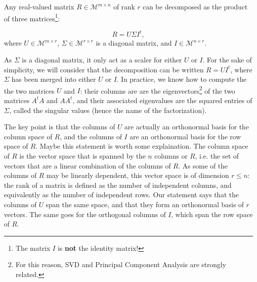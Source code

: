 \begin{proposition}
  Any real-valued matrix $R \in \mathcal{M}^{m \times n}$ of rank $r$ can be
  decomposed as the product of three matrices\footnote{The matrix $I$ is
  \textbf{not} the identity matrix!}:

  $$R = U\Sigma I^t,$$
  where $U\in \mathcal{M}^{m \times r}$, $\Sigma\in \mathcal{M}^{r \times r}$
  is a diagonal matrix, and $I\in \mathcal{M}^{n \times r}$.
\end{proposition}

As $\Sigma$ is a diagonal matrix, it only act as a scaler for either $U$ or
$I$. For the sake of simplicity, we will consider that the decomposition can be
written $R = UI^t$, where $\Sigma$ has been merged into either $U$ or $I$. In
practice, we know how to compute the the two matrices $U$ and $I$: their
columns are are the
eigenvectors\footnote{For this reason, SVD and Principal Component Analysis are
strongly related.} of the two matrices $A^tA$ and $AA^t$, and their associated
eigenvalues are the squared entries of $\Sigma$, called the singular values
(hence the name of the factorization).

The key point is that the columns of $U$ are actually an orthonormal basis for
the column space of $R$, and the columns of $I$ are an orthonormal basis for the
row space of $R$. Maybe this statement is worth some explaination. The column
space of $R$ is the vector space that is spanned by the $n$ columns or $R$,
i.e. the set of vectors that are a linear combination of the columns of $R$. As
some of the columns of $R$ may be linearly dependent, this vector space is of
dimension $r\leq n$: the rank of a matrix is defined as the number of
independent columns, and equivalently as the number of independent rows. Our
statement says that the columns of $U$ span the same space, and that they form
an orthonormal basis of $r$ vectors. The same goes for the orthogonal columns
of $I$, which span the row space of $R$.

